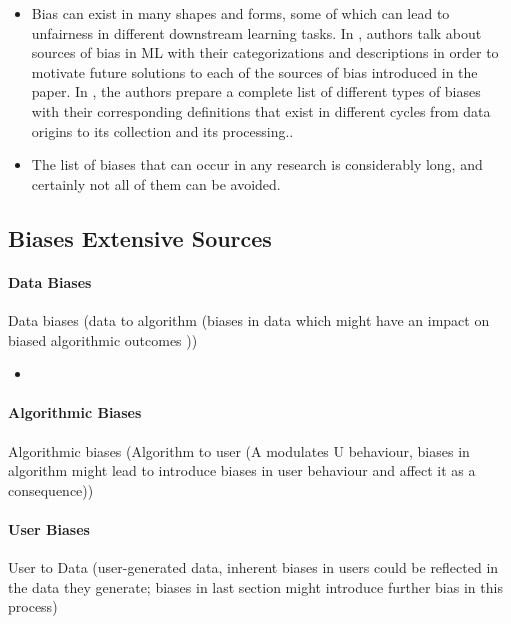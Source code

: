 \begin{refsection}
\begin{itemize}
			\item Bias can exist in many shapes and forms, some of which can lead to unfairness in different downstream learning tasks. In \autocite{M144_Suresh_2021}, authors talk about sources of bias in \gls{ML} with their categorizations and descriptions in order to motivate future solutions to each of the sources of bias introduced in the paper. In \autocite{M120_Olteanu_2019}, the authors prepare a complete list of different types of biases with their corresponding definitions that exist in different cycles from data origins to its collection and its processing.\autocite{Mehrabi_2021}.
		\end{itemize}	
		
		\begin{itemize}
			\item The list of biases that can occur in any research is considerably long, and certainly not all of them can be avoided. \autocite{Chakraborty_2024}
		\end{itemize}
		\rawcitationend
		
		\rawcitationstart
		\subsection{Biases Extensive Sources}
		
		\paragraph{Data Biases}
		Data biases (data to algorithm (biases in data which might have an impact on biased algorithmic outcomes \autocite{Mehrabi_2021}))	
		\begin{itemize}
			\item 
		\end{itemize}	
		
		
		\paragraph{Algorithmic Biases}
		
		Algorithmic biases (Algorithm to user (A modulates U behaviour, biases in algorithm might lead to introduce biases in user behaviour and affect it as a consequence)) \autocite{Mehrabi_2021}
		
		\paragraph{User Biases}
		
		User to Data (user-generated data, inherent biases in users could be reflected in the data they generate; biases in last section might introduce further bias in this process) \autocite{Mehrabi_2021}
		

\end{refsection}
